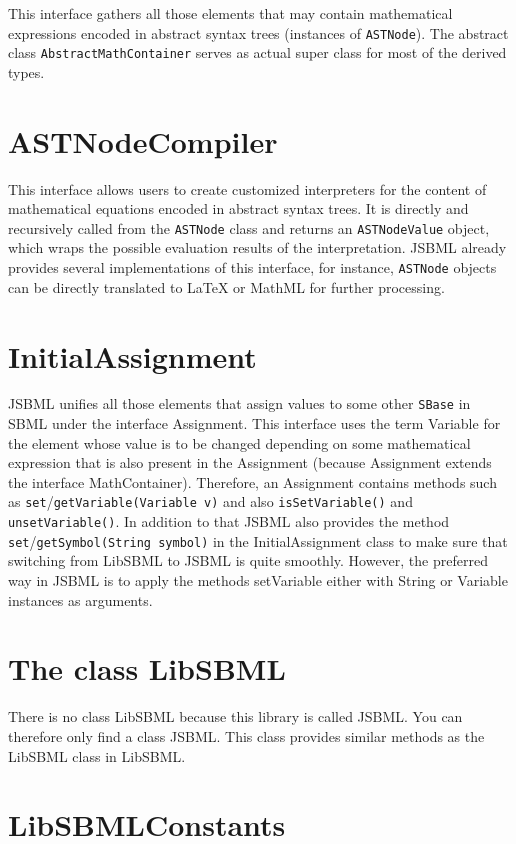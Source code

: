 \documentclass[a4paper,11pt]{scrartcl}
\begin{document}
This interface gathers all those elements that may contain mathematical
expressions encoded in abstract syntax trees (instances of \verb!ASTNode!).
The abstract class \verb!AbstractMathContainer! serves as actual super class
for most of the derived types.

\section{ASTNodeCompiler}

This interface allows users to create customized interpreters for the
content of mathematical equations encoded in abstract syntax trees. It
is directly and recursively called from the \verb!ASTNode! class and returns
an \verb!ASTNodeValue! object, which wraps the possible evaluation results of
the interpretation. JSBML already provides several implementations of
this interface, for instance, \verb!ASTNode! objects can be directly translated
to LaTeX or MathML for further processing.

\section{InitialAssignment}

JSBML unifies all those elements that assign values to some other 
\verb!SBase! in SBML under the interface Assignment. This interface uses
the term Variable for the element whose value is to be changed depending
on some mathematical expression that is also present in the Assignment
(because Assignment extends the interface MathContainer). Therefore,
an Assignment contains methods such as \verb!set!/\verb!getVariable(Variable v)!
and also \verb!isSetVariable()! and \verb!unsetVariable()!. In addition to that
JSBML also provides the method \verb!set!/\verb!getSymbol(String symbol)! in the
InitialAssignment class to make sure that switching from LibSBML to
JSBML is quite smoothly. However, the preferred way in JSBML is to
apply the methods setVariable either with String or Variable instances
as arguments.
 

\section{The class LibSBML}

There is no class LibSBML because this library is called JSBML. You
can therefore only find a class JSBML. This class provides similar
methods as the LibSBML class in LibSBML.

\section{LibSBMLConstants}
\end{document}
